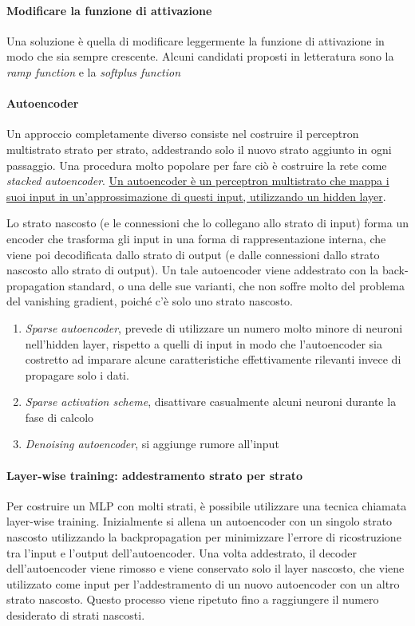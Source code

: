 \paragraph{Modificare la funzione di attivazione}
Una soluzione è quella di modificare leggermente la funzione di attivazione in modo che sia sempre crescente. Alcuni candidati proposti in letteratura sono la \textit{ramp function} e la \textit{softplus function}

\paragraph{Autoencoder}
Un approccio completamente diverso consiste nel costruire il perceptron multistrato strato per strato, addestrando solo il nuovo strato aggiunto in ogni passaggio. Una procedura molto popolare per fare ciò è costruire la rete come \textit{stacked autoencoder}. \uline{Un autoencoder è un perceptron multistrato che mappa i suoi input in un'approssimazione di questi input, utilizzando un hidden layer}.

Lo strato nascosto (e le connessioni che lo collegano allo strato di input) forma un encoder che trasforma gli input in una forma di rappresentazione interna, che viene poi decodificata dallo strato di output (e dalle connessioni dallo strato nascosto allo strato di output). Un tale autoencoder viene addestrato con la back-propagation standard, o una delle sue varianti, che non soffre molto del problema del vanishing gradient, poiché c'è solo uno strato nascosto.

\begin{enumerate}
    \item \textit{Sparse autoencoder}, prevede di utilizzare un numero molto minore di neuroni nell'hidden layer, rispetto a quelli di input in  modo che l'autoencoder sia costretto ad imparare alcune caratteristiche effettivamente rilevanti invece di propagare solo i dati.
    \item \textit{Sparse activation scheme}, disattivare casualmente alcuni neuroni durante la fase di calcolo
    \item \textit{Denoising autoencoder}, si aggiunge rumore all’input
\end{enumerate}

\paragraph{Layer-wise training: addestramento strato per strato} Per costruire un MLP con molti strati, è possibile utilizzare una tecnica chiamata layer-wise training. Inizialmente si allena un autoencoder con un singolo strato nascosto utilizzando la backpropagation per minimizzare l'errore di ricostruzione tra l'input e l'output dell'autoencoder. Una volta addestrato, il decoder dell'autoencoder viene rimosso e viene conservato solo il layer nascosto, che viene utilizzato come input per l'addestramento di un nuovo autoencoder con un altro strato nascosto. Questo processo viene ripetuto fino a raggiungere il numero desiderato di strati nascosti.

